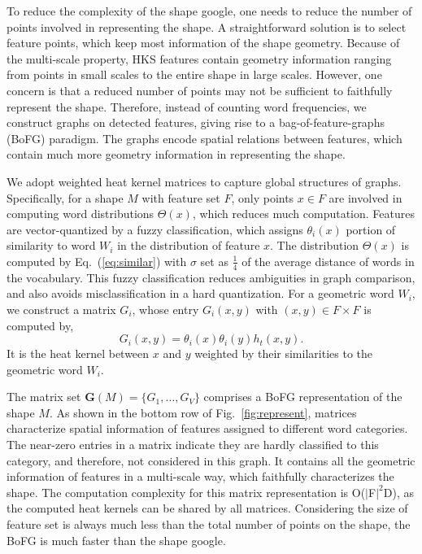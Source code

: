 To reduce the complexity of the shape google, one needs to reduce the number of points involved in representing the shape. A straightforward solution is to select feature points, which keep most information of the shape geometry. Because of the multi-scale property, HKS features contain geometry information ranging from points in small scales to the entire shape in large scales. However, one concern is that a reduced number of points may not be sufficient to faithfully represent the shape. Therefore, instead of counting word frequencies, we construct graphs on detected features, giving rise to a bag-of-feature-graphs (BoFG) paradigm. The graphs encode spatial relations between features, which contain much more geometry information in representing the shape.

We adopt weighted heat kernel matrices to capture global structures of graphs. Specifically, for a shape $M$ with feature set $F$, only points $x\in F$ are involved in computing word distributions $\Theta(x)$, which reduces much computation. Features are vector-quantized by a fuzzy classification, which assigns $\theta_i(x)$ portion of similarity to word $W_i$ in the distribution of feature $x$. The distribution $\Theta(x)$ is computed by Eq.~(\ref{eq:similar}) with $\sigma$ set as $\frac{1}{4}$ of the average distance of words in the vocabulary. This fuzzy classification reduces ambiguities in graph comparison, and also avoids misclassification in a hard quantization. For a geometric word $W_i$, we construct a matrix $G_i$, whose entry $G_i(x,y)$ with $(x,y)\in F\times F$ is computed by,
\begin{equation}
G_i(x,y)=\theta_i(x)\theta_i(y)h_t(x,y).
\end{equation}
It is the heat kernel between $x$ and $y$ weighted by their similarities to the geometric word $W_i$.

The matrix set $\textbf{G}(M)=\{G_1,\dots,G_V\}$ comprises a BoFG representation of the shape $M$. As shown in the bottom row of Fig.~\ref{fig:represent}, matrices characterize spatial information of features assigned to different word categories. The near-zero entries in a matrix indicate they are hardly classified to this category, and therefore, not considered in this graph. It contains all the geometric information of features in a multi-scale way, which faithfully characterizes the shape. The computation complexity for this matrix representation is O($|$F$|^2$D), as the computed heat kernels can be shared by all matrices. Considering the size of feature set is always much less than the total number of points on the shape, the BoFG is much faster than the shape google.

